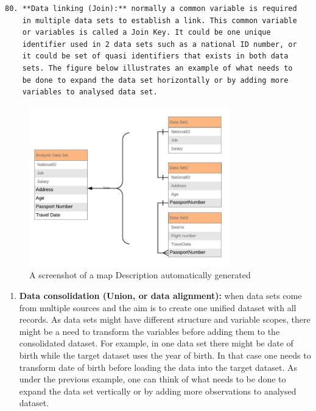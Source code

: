 \documentclass[
]{article}
\providecommand{\tightlist}{%
  \setlength{\itemsep}{0pt}\setlength{\parskip}{0pt}}
\begin{document}
\begin{verbatim}
80. **Data linking (Join):** normally a common variable is required
    in multiple data sets to establish a link. This common variable
    or variables is called a Join Key. It could be one unique
    identifier used in 2 data sets such as a national ID number, or
    it could be set of quasi identifiers that exists in both data
    sets. The figure below illustrates an example of what needs to
    be done to expand the data set horizontally or by adding more
    variables to analysed data set.
\end{verbatim}

\begin{figure}
\centering
\includegraphics[width=3.41528in,height=2.74028in]{media/image21.png}
\caption{A screenshot of a map Description automatically
generated}
\end{figure}

\begin{enumerate}
\def\labelenumi{\arabic{enumi}.}
\setcounter{enumi}{80}
\tightlist
\item
  \textbf{Data consolidation (Union, or data alignment):} when data sets
  come from multiple sources and the aim is to create one unified
  dataset with all records. As data sets might have different
  structure and variable scopes, there might be a need to transform
  the variables before adding them to the consolidated dataset. For
  example, in one data set there might be date of birth while the
  target dataset uses the year of birth. In that case one needs to
  transform date of birth before loading the data into the target
  dataset. As under the previous example, one can think of what needs
  to be done to expand the data set vertically or by adding more
  observations to analysed dataset.
\end{enumerate}
\end{document}

